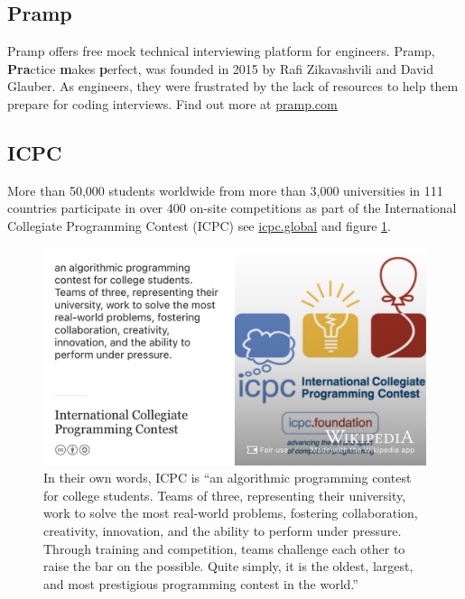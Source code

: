 \documentclass[
]{book}
\begin{document}
\hypertarget{pramp}{%
\subsection{Pramp}\label{pramp}}

Pramp offers free mock technical interviewing platform for engineers. Pramp, \textbf{Pra}ctice \textbf{m}akes \textbf{p}erfect, was founded in 2015 by Rafi Zikavashvili and David Glauber. As engineers, they were frustrated by the lack of resources to help them prepare for coding interviews. Find out more at \href{https://www.pramp.com}{pramp.com}

\hypertarget{icpc}{%
\subsection{ICPC}\label{icpc}}

More than 50,000 students worldwide from more than 3,000 universities in 111 countries participate in over 400 on-site competitions as part of the International Collegiate Programming Contest (ICPC) see \href{https://icpc.global/}{icpc.global} and figure \ref{fig:icpc-fig}.

\begin{figure}

{\centering \includegraphics[width=0.99\linewidth]{images/International-Collegiate-Programming-Contest} 

}

\caption{In their own words, ICPC is ``an algorithmic programming contest for college students. Teams of three, representing their university, work to solve the most real-world problems, fostering collaboration, creativity, innovation, and the ability to perform under pressure. Through training and competition, teams challenge each other to raise the bar on the possible. Quite simply, it is the oldest, largest, and most prestigious programming contest in the world.'' \citep{icpc}}\label{fig:icpc-fig}
\end{figure}
\end{document}
